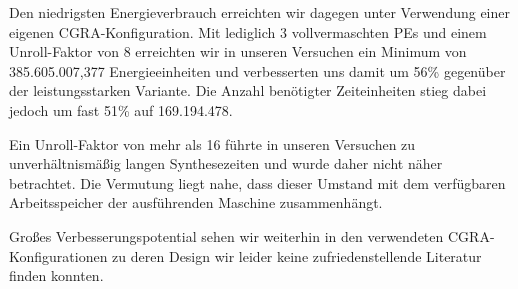 \documentclass[parskip,
							 oneside,
							 11pt,
							 noheadingspace,
							 accentcolor=tud1d,
							 bigchapter,
							 colorback]{tudreport}
\begin{document}
Den niedrigsten Energieverbrauch erreichten wir dagegen unter Verwendung einer eigenen CGRA-Konfiguration. Mit lediglich 3 vollvermaschten PEs und einem Unroll-Faktor von 8 erreichten wir in unseren Versuchen ein Minimum von 385.605.007,377 Energieeinheiten und verbesserten uns damit um 56\% gegenüber der leistungsstarken Variante. Die Anzahl benötigter Zeiteinheiten stieg dabei jedoch um fast 51\% auf 169.194.478.

Ein Unroll-Faktor von mehr als 16 führte in unseren Versuchen zu unverhältnismäßig langen Synthesezeiten und wurde daher nicht näher betrachtet. Die Vermutung liegt nahe, dass dieser Umstand mit dem verfügbaren Arbeitsspeicher der ausführenden Maschine zusammenhängt.

Großes Verbesserungspotential sehen wir weiterhin in den verwendeten CGRA-Konfigurationen zu deren Design wir leider keine zufriedenstellende Literatur finden konnten.




\clearpage

\end{document}
